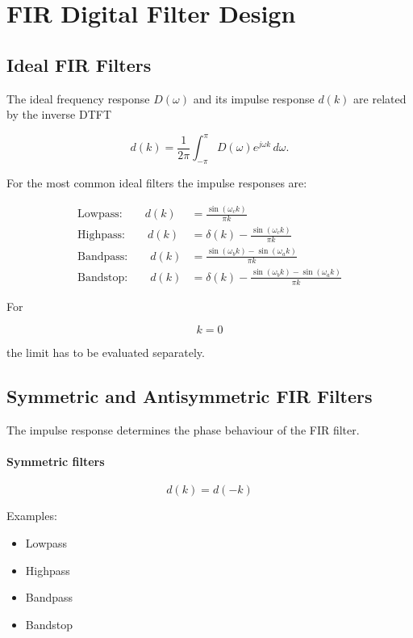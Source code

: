 \section{FIR Digital Filter Design}
\subsection{Ideal FIR Filters}

The ideal frequency response $D(\omega)$ and its impulse response
$d(k)$ are related by the inverse DTFT

\[
d(k)=\frac{1}{2\pi}
\int_{-\pi}^{\pi}
D(\omega)e^{j\omega k}\,d\omega.
\]

For the most common ideal filters the impulse responses are:

\[
\boxed{
\begin{aligned}
\text{Lowpass:}\qquad
d(k)
&=
\frac{\sin(\omega_ck)}{\pi k}
\\[1ex]
\text{Highpass:}\qquad
d(k)
&=
\delta(k)-
\frac{\sin(\omega_ck)}{\pi k}
\\[1ex]
\text{Bandpass:}\qquad
d(k)
&=
\frac{\sin(\omega_bk)-\sin(\omega_ak)}
{\pi k}
\\[1ex]
\text{Bandstop:}\qquad
d(k)
&=
\delta(k)-
\frac{\sin(\omega_bk)-\sin(\omega_ak)}
{\pi k}
\end{aligned}
}
\]

For

\[
k=0
\]

the limit has to be evaluated separately.


\subsection{Symmetric and Antisymmetric FIR Filters}

The impulse response determines the phase behaviour of the FIR filter.

\paragraph{Symmetric filters}

\[
d(k)=d(-k)
\]

Examples:

\begin{itemize}
\item Lowpass
\item Highpass
\item Bandpass
\item Bandstop
\end{itemize}

